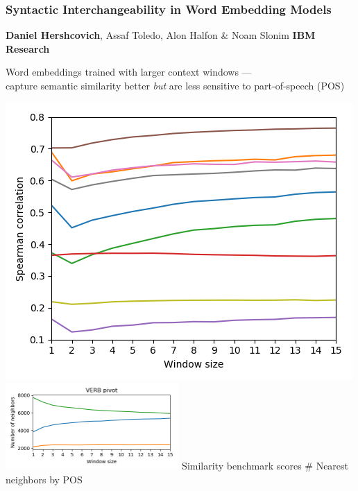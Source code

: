 \documentclass[t,xcolor={svgnames,table},aspectratio=169]{beamer}
\begin{document}
\begin{frame}
\frametitle{Syntactic Interchangeability in Word Embedding Models}
  \centering
  \textbf{Daniel Hershcovich}, Assaf Toledo, Alon Halfon \& Noam Slonim
  \hfill
  \textbf{IBM Research}
  \vfill
  
  \begin{adjustbox}{margin=5,frame,minipage=\textwidth,center,color=purple}
    Word embeddings trained with larger context windows --- \\
    capture semantic similarity better \textit{but} are less sensitive to part-of-speech (POS)
  \end{adjustbox}
  \vfill
  
  \includegraphics[width=.45\textwidth,trim=16.5mm 13mm 0 0,clip]{similarities_fasttext_enwiki-20170501-clean_cbow-300d-min500_eval.png}\hfill
  \includegraphics[width=.5\textwidth,trim=2cm 14mm 0 7.5mm,clip,height=33mm]{VERB_nn_100_fasttext_enwiki-20170501-clean_cbow-300d-min500_pos.png}
  Similarity benchmark scores \hspace{28mm} \# Nearest neighbors by POS

\end{frame}
\end{document}
